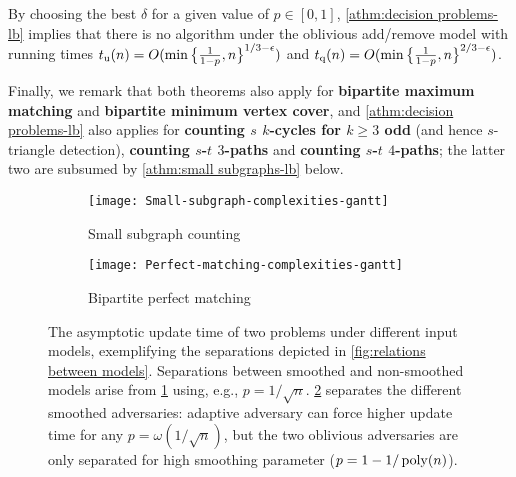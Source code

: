\documentclass[letter,11pt]{article}
\newcommand{\paths}[3]{${#1}$-${#2}$ ${#3}$-paths\xspace}
\newcommand{\tu}{t_{\textnormal{u}}}
\newcommand{\tq}{t_{\textnormal{q}}}
\begin{document}
By choosing the best $\delta$ for a given value of $p\in[0,1]$, \cref{athm:decision problems-lb}
implies that there is no algorithm under the oblivious add/remove model with running times 
$\tu(n)=O(\min\big\{\frac{1}{1-p}, n\big\} ^{1/3-\eps})$
and
$\tq(n)
=O(\min\big\{\frac{1}{1-p}, n\big\} ^{2/3-\eps})$.

Finally, we remark that both theorems also apply for
\textbf{bipartite maximum matching} and \textbf{bipartite minimum vertex cover},
and \cref{athm:decision problems-lb} also applies for
	\textbf{counting $s$ $k$-cycles for $k\geq 3$ odd} (and hence $s$-triangle detection),
	\textbf{counting \paths{s}{t}{3}} and \textbf{counting \paths{s}{t}{4}};
 the latter two are subsumed by \cref{athm:small subgraphs-lb} below.


\begin{figure}
	\centering
	\begin{subfigure}[b]{0.41\textwidth}
		\centering
		\texttt{[image: Small-subgraph-complexities-gantt]}
		\caption{Small subgraph counting}
		\label{fig:subgraph counting}
	\end{subfigure}
	\hfill
	\begin{subfigure}[b]{0.54\textwidth}
		\centering
		\texttt{[image: Perfect-matching-complexities-gantt]}
		\caption{Bipartite perfect matching}
		\label{fig:bipartite perfect matching}
	\end{subfigure}
	\caption{
    The asymptotic update time of two problems under different input models, exemplifying the separations depicted in \cref{fig:relations between models}.
    Separations between smoothed and non-smoothed models arise from \cref{fig:subgraph counting} using, e.g., $p = 1/\sqrt{n}$. \cref{fig:bipartite perfect matching} separates the different smoothed adversaries: adaptive adversary can force higher update time for any $p = \omega(1/\sqrt{n})$, but the two oblivious adversaries are only separated for high smoothing parameter ($p = 1-1/\operatorname{poly}(n)$).}
	\label{fig:complexities separating models}
\end{figure}
\end{document}
